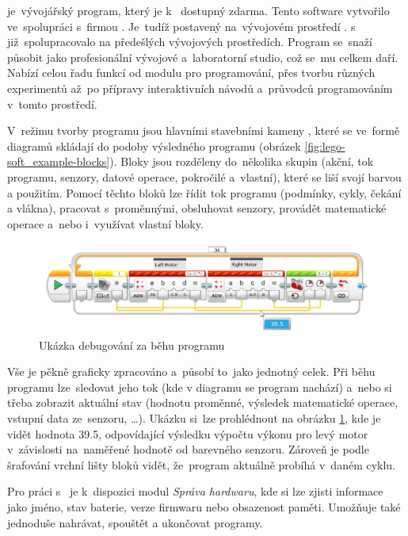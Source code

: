 \legoSW{} je~vývojářský program, který je k~\EVthree{} dostupný zdarma. 
Tento  software vytvořilo \lego{} ve~spolupráci s~firmou \NI{}. 
Je~tudíž postavený na~vývojovém prostředí \labview{}. 
\lego{} s~\NI{} již~spolupracovalo na předešlých vývojových prostředích. %
Program se~snaží působit jako profesionální vývojové a~laboratorní studio, což se~mu celkem daří.
Nabízí celou řadu funkcí od modulu pro programování, přes tvorbu různých experimentů až~po přípravy interaktivních návodů a~průvodců programováním v~tomto prostředí.

V~režimu tvorby programu jsou hlavními stavebními kameny \EVblocks, které se ve~formě diagramů skládají do podoby výsledného programu (obrázek \ref{fig:lego-soft_example-blocks}).
Bloky jsou rozděleny do~několika skupin (akční, tok programu, senzory, datové operace, pokročilé a~vlastní), které se liší svojí barvou a použitím. 
Pomocí těchto bloků lze řídit tok programu (podmínky, cykly, čekání a vlákna), pracovat s~proměnnými, obsluhovat senzory, provádět matematické operace a~nebo i~využívat vlastní bloky.

\begin{figure}[h]
	\centering
	\includegraphics[width=\textwidth]{images/lego-soft/lego-soft_live-debuging_line-advance.png}
	\caption{Ukázka debugování za běhu programu}
	\label{fig:lego-soft_live-debuging_line-advance}
\end{figure}

Vše je pěkně graficky zpracováno a~působí to~jako jednotný celek. 
Při běhu programu lze~sledovat jeho tok (kde v diagramu se program nachází) a~nebo si třeba zobrazit aktuální stav (hodnotu proměnné, výsledek matematické operace, vstupní data ze~senzoru, \dots). 
Ukázku si~lze prohlédnout na obrázku \ref{fig:lego-soft_live-debuging_line-advance}, kde je vidět hodnota 39.5, odpovídající výsledku výpočtu výkonu pro levý motor v~závislosti na~naměřené hodnotě od barevného senzoru.
Zároveň je podle šrafování vrchní lišty bloků vidět, že~program aktuálně probíhá v~daném cyklu.

Pro práci s~ je k~dispozici modul {\it Správa hardwaru}, kde si lze zjisti informace jako jméno, stav baterie, verze firmwaru nebo obsazenost paměti. 
Umožňuje také jednoduše nahrávat, spouštět a ukončovat programy. 

